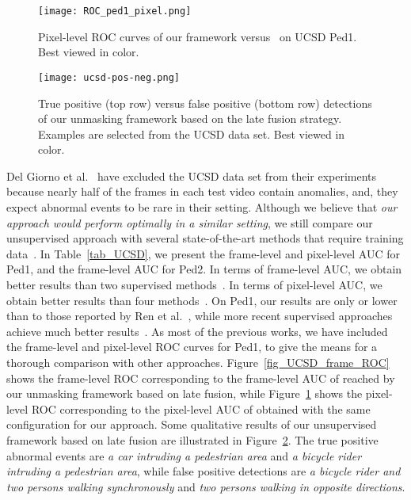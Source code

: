 \documentclass[10pt,twocolumn,letterpaper]{article}
\begin{document}
\begin{figure}
\begin{center}
\texttt{[image: ROC\_ped1\_pixel.png]}
\end{center}
\vspace*{-0.2cm}
\caption{Pixel-level ROC curves of our framework versus~\cite{Cong-CVPR-2011,Kim-CVPR-2009,Lu-ICCV-2013,Mahadevan-CVPR-2010,Mehran-CVPR-2009,Xu-BMVC-2015,Zhang-PR-2016} on UCSD Ped1. Best viewed in color.}
\label{fig_UCSD_pixel_ROC}
\end{figure}

\begin{figure}
\begin{center}
\texttt{[image: ucsd-pos-neg.png]}
\end{center}
\vspace*{-0.2cm}
\caption{True positive (top row) versus false positive (bottom row) detections of our unmasking framework based on the late fusion strategy. Examples are selected from the UCSD data set. Best viewed in color.}
\label{fig_UCSD_pos_neg}
\vspace*{-0.4cm}
\end{figure}

Del Giorno et al.~\cite{Giorno-ECCV-2016} have excluded the UCSD data set from their experiments because nearly half of the frames in each test video contain anomalies, and, they expect abnormal events to be rare in their setting. Although we believe that \emph{our approach would perform optimally in a similar setting}, we still compare our unsupervised approach with several state-of-the-art methods that require training data~\cite{Cong-CVPR-2011,Kim-CVPR-2009,Lu-ICCV-2013,Mahadevan-CVPR-2010,Mehran-CVPR-2009,Ren-BMVC-2015,Saligrama-CVPR-2012,Sun-PR-2017,Xu-BMVC-2015,Zhang-PR-2016}. In Table~\ref{tab_UCSD}, we present the frame-level and pixel-level AUC for Ped1, and the frame-level AUC for Ped2. In terms of frame-level AUC, we obtain better results than two supervised methods~\cite{Kim-CVPR-2009,Mehran-CVPR-2009}. In terms of pixel-level AUC, we obtain better results than four methods~\cite{Cong-CVPR-2011,Kim-CVPR-2009,Mahadevan-CVPR-2010,Mehran-CVPR-2009}. On Ped1, our results are only  or  lower than to those reported by Ren et al.~\cite{Ren-BMVC-2015}, while more recent supervised approaches achieve much better results~\cite{Sun-PR-2017,Zhang-PR-2016}. As most of the previous works, we have included the frame-level and pixel-level ROC curves for Ped1, to give the means for a thorough comparison with other approaches. Figure~\ref{fig_UCSD_frame_ROC} shows the frame-level ROC corresponding to the frame-level AUC of  reached by our unmasking framework based on late fusion, while Figure~\ref{fig_UCSD_pixel_ROC} shows the pixel-level ROC corresponding to the pixel-level AUC of  obtained with the same configuration for our approach.
Some qualitative results of our unsupervised framework based on late fusion are illustrated in Figure~\ref{fig_UCSD_pos_neg}. The true positive abnormal events are \emph{a car intruding a pedestrian area} and \emph{a bicycle rider intruding a pedestrian area}, while false positive detections are \emph{a bicycle rider and two persons walking synchronously} and \emph{two persons walking in opposite directions}. 
\end{document}
